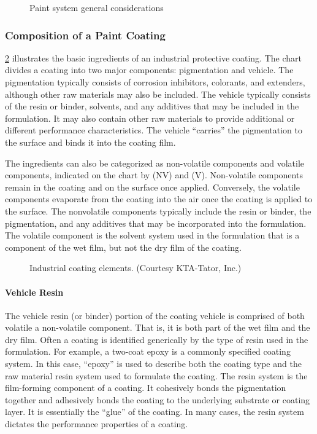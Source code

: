 \begin{figure}
  \caption{Paint system general considerations}
  \label{fig:paint-system}
\end{figure}

\subsubsection{Composition of a Paint Coating}
\cref{fig:industry-coating} illustrates the basic ingredients of an industrial protective coating. The chart divides a coating into two
major components: pigmentation and vehicle. The pigmentation typically consists of corrosion inhibitors, colorants,
and extenders, although other raw materials may also be included. The vehicle typically consists of the resin or
binder, solvents, and any additives that may be included in the formulation. It may also contain other raw materials to
provide additional or different performance characteristics. The vehicle “carries” the pigmentation to the surface and
binds it into the coating film.

The ingredients can also be categorized as non-volatile components and volatile components, indicated on the
chart by (NV) and (V). Non-volatile components remain in the coating and on the surface once applied. Conversely,
the volatile components evaporate from the coating into the air once the coating is applied to the surface. The nonvolatile
components typically include the resin or binder, the pigmentation, and any additives that may be
incorporated into the formulation. The volatile component is the solvent system used in the formulation that is a
component of the wet film, but not the dry film of the coating.

\begin{figure}
  \caption{Industrial coating elements. (Courtesy KTA-Tator, Inc.)}
  \label{fig:industry-coating}
\end{figure}


\paragraph{Vehicle Resin}
The vehicle resin (or binder) portion of the coating vehicle is comprised of both volatile a non-volatile
component. That is, it is both part of the wet film and the dry film. Often a coating is identified generically by the type of resin used in the formulation. For example, a two-coat epoxy is a commonly specified coating system. In this
case, “epoxy” is used to describe both the coating type and the raw material resin system used to formulate the
coating. The resin system is the film-forming component of a coating. It cohesively bonds the pigmentation together
and adhesively bonds the coating to the underlying substrate or coating layer. It is essentially the “glue” of the
coating. In many cases, the resin system dictates the performance properties of a coating.

